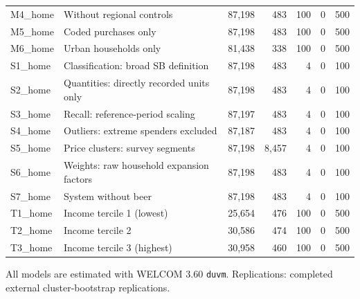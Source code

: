 \documentclass[
  11pt,
]{article}
\begin{document}
\begin{table}[!htbp]
\begin{threeparttable}
\begin{tabular}{lp{5.2cm}rrrrr}
M4\_home & Without regional controls & 87,198 & 483 & 100 & 0 & 500 \\
M5\_home & Coded purchases only & 87,198 & 483 & 100 & 0 & 500 \\
M6\_home & Urban households only & 81,438 & 338 & 100 & 0 & 500 \\
S1\_home & Classification: broad SB definition & 87,198 & 483 & 4 & 0 & 100 \\
S2\_home & Quantities: directly recorded units only & 87,198 & 483 & 4 & 0 & 100 \\
S3\_home & Recall: reference-period scaling & 87,197 & 483 & 4 & 0 & 100 \\
S4\_home & Outliers: extreme spenders excluded & 87,187 & 483 & 4 & 0 & 100 \\
S5\_home & Price clusters: survey segments & 87,198 & 8,457 & 4 & 0 & 100 \\
S6\_home & Weights: raw household expansion factors & 87,198 & 483 & 4 & 0 & 100 \\
S7\_home & System without beer & 87,198 & 483 & 4 & 0 & 100 \\
T1\_home & Income tercile 1 (lowest) & 25,654 & 476 & 100 & 0 & 500 \\
T2\_home & Income tercile 2 & 30,586 & 474 & 100 & 0 & 500 \\
T3\_home & Income tercile 3 (highest) & 30,958 & 460 & 100 & 0 & 500 \\
\bottomrule
\end{tabular}
\begin{tablenotes}[flushleft]
\footnotesize
\item All models are estimated with WELCOM 3.60 \texttt{duvm}. Replications: completed external cluster-bootstrap replications.
\end{tablenotes}
\end{threeparttable}
\end{table}

\clearpage
\end{document}
